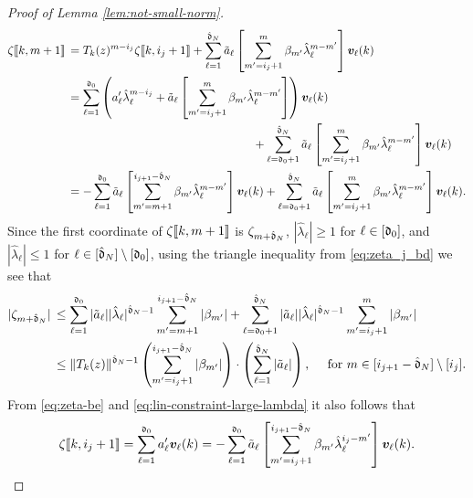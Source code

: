 \documentclass{amsart}
\numberwithin{equation}{section}
\begin{document}
\begin{proof}[Proof of Lemma \ref{lem:not-small-norm}]
\begin{align}\label{eq:zeta_j_bd}
\zeta \llbracket k,m+1 \rrbracket & \, = T_k(z)^{m-i_j} \zeta \llbracket k,i_j+1 \rrbracket + \sum_{\ell=1}^{\hat{\mathfrak{d}}_N} \tilde{a}_\ell \left[\sum_{m'=i_j+1}^m \beta_{m'} \hat{\lambda}_\ell^{m-m'} \right] {\bm v}_\ell(k) \notag\\
& \, = \sum_{\ell=1}^{\mathfrak{d}_0} \left(a_\ell' \hat{\lambda}_\ell^{m-i_j}  + \tilde{a}_\ell \left[\sum_{m'=i_j+1}^m \beta_{m'} \hat{\lambda}_\ell^{m-m'} \right] \right){\bm v}_\ell(k) \notag\\
& \qquad \qquad \qquad  \qquad \qquad \qquad   \qquad \qquad + \sum_{\ell=\mathfrak{d}_0+1}^{\hat{\mathfrak{d}}_N} \tilde{a}_\ell \left[\sum_{m'=i_j+1}^m \beta_{m'} \hat{\lambda}_\ell^{m-m'} \right] {\bm v}_\ell(k) \notag\\
& \, = -\sum_{\ell=1}^{\mathfrak{d}_0}  \tilde{a}_\ell \left[\sum_{m'=m+1}^{i_{j+1}-\hat{\mathfrak{d}}_N} \beta_{m'} \hat{\lambda}_\ell^{m-m'} \right] {\bm v}_\ell(k) + \sum_{\ell=\mathfrak{d}_0+1}^{\hat{\mathfrak{d}}_N} \tilde{a}_\ell \left[\sum_{m'=i_j+1}^m \beta_{m'} \hat{\lambda}_\ell^{m-m'} \right] {\bm v}_\ell(k).
\end{align}
Since the first coordinate of $\zeta\llbracket k,m+1 \rrbracket$ is $\zeta_{m+\hat{\mathfrak{d}}_N}$, $|\hat{\lambda}_\ell| \ge 1$ for $\ell \in [\mathfrak{d}_0]$, and $|\hat{\lambda}_\ell| \le 1$ for $\ell \in [\hat{\mathfrak{d}}_N]\setminus [\mathfrak{d}_0]$, using the triangle inequality from  \eqref{eq:zeta_j_bd} we see that
\begin{align}\label{eq:zeta-bd-1}
|\zeta_{m+\hat{\mathfrak{d}}_N}| & \, \le \sum_{\ell=1}^{\mathfrak{d}_0} |\tilde{a}_\ell| |\hat{\lambda}_\ell|^{\hat{\mathfrak{d}}_N-1} \sum_{m'=m+1}^{i_{j+1}-\hat{\mathfrak{d}}_N} |\beta_{m'}| + \sum_{\ell=\mathfrak{d}_0+1}^{\hat{\mathfrak{d}}_N} |\tilde{a}_\ell| |\hat{\lambda}_\ell|^{\hat{\mathfrak{d}}_N-1} \sum_{m'=i_j+1}^{m} |\beta_{m'}| \notag\\
& \, \le \|T_k(z)\|^{\hat{\mathfrak{d}}_N-1} \left( \sum_{m'=i_j+1}^{i_{j+1}-\hat{\mathfrak{d}}_N} |\beta_{m'}|\right) \cdot  \left( \sum_{\ell=1}^{\hat{\mathfrak{d}}_N} |\tilde{a}_\ell|\right), \quad \text{ for } m \in [i_{j+1}-\hat{\mathfrak{d}}_N]\setminus [i_j].
\end{align}
From \eqref{eq:zeta-be} and \eqref{eq:lin-constraint-large-lambda} it also follows that
\begin{align}
\zeta\dvec{k,i_j+1}= \sum_{\ell=1}^{\gd_0} a_\ell' {\bm v}_\ell(k) = - \sum_{\ell=1}^{\gd_0}\tilde{a}_\ell \left[\sum_{m'=i_j+1}^{i_{j+1}-\hat\gd_N} \beta_{m'} \hat{\lambda}_\ell^{i_j-m'} \right] {\bm v}_{\ell}(k). \notag

\end{align}
\end{proof}
\end{document}

